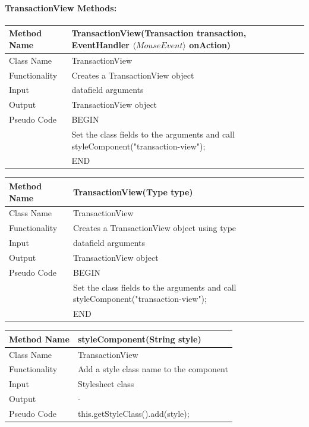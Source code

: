 \documentclass[12pt]{article}
\begin{document}
\paragraph{TransactionView Methods:}
\begin{tabular}{ |p{3cm}||p{\colWidth}|  }
	\hline
	Method Name &  TransactionView(Transaction transaction, EventHandler $\langle MouseEvent \rangle$ onAction)\\
	\hline
	Class Name & TransactionView\\
	\hline
	Functionality & Creates a TransactionView object\\
	\hline
	Input & datafield arguments\\
	\hline
	Output & TransactionView object\\
	\hline
	Pseudo Code&BEGIN\\ & Set the class fields to the arguments and call styleComponent("transaction-view");\\&END\\
	\hline
\end{tabular} 


\begin{tabular}{ |p{3cm}||p{\colWidth}|  }
	\hline
	Method Name &  TransactionView(Type type)\\
	\hline
	Class Name & TransactionView\\
	\hline
	Functionality & Creates a TransactionView object using type\\
	\hline
	Input & datafield arguments\\
	\hline
	Output & TransactionView object\\
	\hline
	Pseudo Code&BEGIN\\ & Set the class fields to the arguments and call styleComponent("transaction-view");\\&END\\
	\hline
\end{tabular}  


\begin{tabular}{ |p{3cm}||p{\colWidth}|  }
	\hline
	Method Name &  styleComponent(String style)\\
	\hline
	Class Name & TransactionView\\
	\hline
	Functionality & Add a style class name to the component\\
	\hline
	Input & Stylesheet class\\
	\hline
	Output & -\\
	\hline
	Pseudo Code & this.getStyleClass().add(style);\\
	\hline
\end{tabular}  
\end{document}
